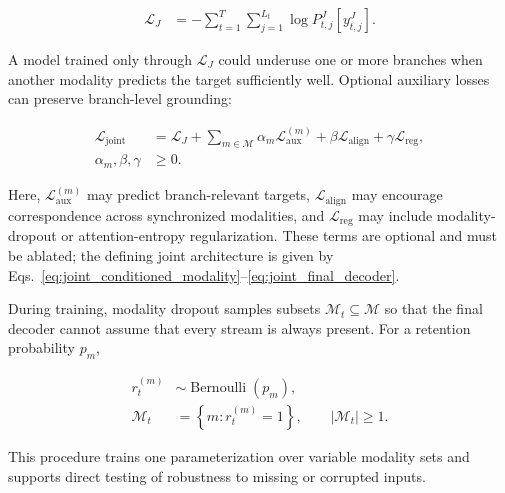 \begin{equation}
\begin{aligned}
    \mathcal{L}_{J}
    &= -\sum_{t=1}^{T}
       \sum_{j=1}^{L_t}
       \log P_{t,j}^{J}\!\left[y_{t,j}^{J}\right].
\end{aligned}
\label{eq:joint_primary_loss}
\end{equation}

A model trained only through $\mathcal{L}_{J}$ could underuse one or more branches when another modality predicts the target sufficiently well. Optional auxiliary losses can preserve branch-level grounding:

\begin{equation}
\begin{aligned}
    \mathcal{L}_{\mathrm{joint}}
    &= \mathcal{L}_{J}
       +\sum_{m\in\mathcal{M}}
        \alpha_m\mathcal{L}_{\mathrm{aux}}^{(m)}
       +\beta\mathcal{L}_{\mathrm{align}}
       +\gamma\mathcal{L}_{\mathrm{reg}},\\
    \alpha_m,\beta,\gamma&\geq0.
\end{aligned}
\label{eq:joint_total_loss}
\end{equation}

Here, $\mathcal{L}_{\mathrm{aux}}^{(m)}$ may predict branch-relevant targets, $\mathcal{L}_{\mathrm{align}}$ may encourage correspondence across synchronized modalities, and $\mathcal{L}_{\mathrm{reg}}$ may include modality-dropout or attention-entropy regularization. These terms are optional and must be ablated; the defining joint architecture is given by Eqs.~\eqref{eq:joint_conditioned_modality}--\eqref{eq:joint_final_decoder}.

During training, modality dropout samples subsets $\mathcal{M}_t\subseteq\mathcal{M}$ so that the final decoder cannot assume that every stream is always present. For a retention probability $p_m$,

\begin{equation}
\begin{aligned}
    r_t^{(m)}&\sim\operatorname{Bernoulli}(p_m),\\
    \mathcal{M}_t&=\left\{m:r_t^{(m)}=1\right\},
    \qquad
    |\mathcal{M}_t|\geq1.
\end{aligned}
\label{eq:joint_modality_dropout}
\end{equation}

This procedure trains one parameterization over variable modality sets and supports direct testing of robustness to missing or corrupted inputs.

